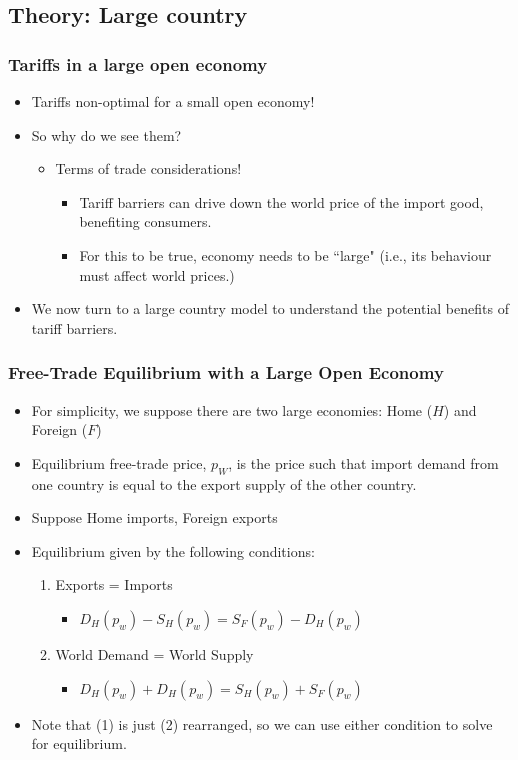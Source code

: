 \documentclass{beamer}
\begin{document}
\subsection{Theory: Large country}

\begin{frame}
	\frametitle{Tariffs in a large open economy}
	\begin{itemize}
		\item Tariffs non-optimal for a small open economy!
		\item So why do we see them?
		\begin{itemize}
				\item Terms of trade considerations!
					\begin{itemize}
						\item Tariff barriers can drive down the world price of the import good, benefiting consumers.
						\item For this to be true, economy needs to be ``large" (i.e., its behaviour must affect world prices.)
					\end{itemize}
			\end{itemize}
		\item We now turn to a large country model to understand the potential benefits of tariff barriers.
	\end{itemize}
\end{frame}

\begin{frame}
	\frametitle{Free-Trade Equilibrium with a Large Open Economy}
	\begin{itemize}
		\item For simplicity, we suppose there are two large economies: Home ($H$) and Foreign ($F$) 
		\item Equilibrium free-trade price, $p_W$, is the price such that import demand from one country is equal to the export supply of the other country.
		\item Suppose Home imports, Foreign exports
		\item Equilibrium given by the following conditions:
			\begin{enumerate}
				\item Exports = Imports
								\begin{itemize}
									\item $D_H(p_w) - S_H(p_w) = S_F(p_w) - D_H(p_w)$
								\end{itemize}
			\item World Demand = World Supply
					\begin{itemize}
						\item $D_H(p_w) +  D_H(p_w) = S_H(p_w) + S_F(p_w)$ 
					\end{itemize}
			\end{enumerate}
		\item Note that (1) is just (2) rearranged, so we can use either condition to solve for equilibrium.
	\end{itemize}
\end{frame}
\end{document}
